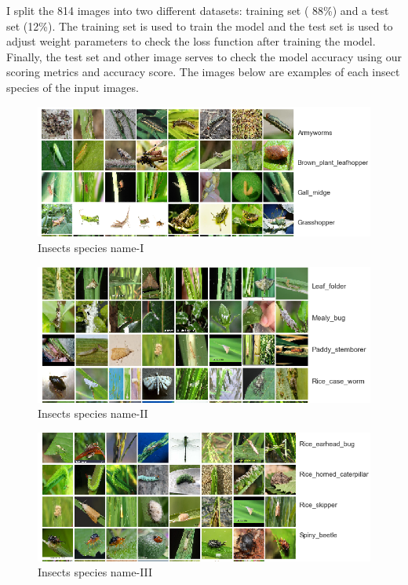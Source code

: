 I split the 814 images into two different datasets: training set ( 88\%) and a test set (12\%). The training set is used to train the model and the test set is used to adjust weight parameters to check the loss function after training the model. Finally, the test set and other image serves to check the model accuracy using our scoring metrics and accuracy score. The images below are examples of each insect species of the input images. 
\noindent
\begin{figure}
	\centering
	\includegraphics[width=\linewidth]{img10}
	\caption{Insects species name-I}
	\label{fig:img10}
\end{figure}
\noindent
\begin{figure}
	\centering
	\includegraphics[width=\linewidth]{img11}
	\caption{Insects species name-II}
	\label{fig:img11}
\end{figure}
\noindent
\begin{figure}
	\centering
	\includegraphics[width=\linewidth]{img12}
	\caption{Insects species name-III}
	\label{fig:img12}
\end{figure}

